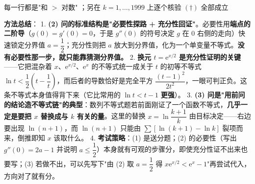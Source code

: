 每一行都是"和 $>$ 对数" ；另在 $k=1,\dots,1999$ 上逐个核验 $(\dagger)$ 全部成立 

\begin{gktip}
\textbf{方法总结}：
1. \textbf{(2) 问的标准结构是"必要性探路 + 充分性回证"}。必要性用\textbf{端点的二阶导}（$g(0)=g'(0)=0$，于是 $g''(0)$ 的符号决定 $g$ 在 $0$ 右侧的走向）快速锁定分界值 $a=\dfrac12$；充分性则把 $a$ 放大到分界值，化为一个单变量不等式。\textbf{没有必要性那一步，就只能靠猜测分界值。}
2. \textbf{换元 $t=\mathrm e^{x/2}$ 是充分性证明的关键}——它把混杂着 $x$、$\mathrm e^{x/2}$、$\mathrm e^{x}$ 的不等式统一成关于 $t$ 的初等不等式 $\ln t<\dfrac12\left(t-\dfrac1t\right)$，而后者的导数恰好是完全平方 $\dfrac{(t-1)^{2}}{2t^{2}}$，一眼可判正负。这条不等式本身值得背下来（它比常用的 $\ln t<t-1$ \textbf{更强}）。
3. \textbf{(3) 问是"用前问的结论造不等式链"的典型}：数列不等式题若前面刚证了一个函数不等式，\textbf{几乎一定是要把 $x$ 替换成与 $k$ 有关的量}。这里的替换 $x=\ln\dfrac{k+1}k$ 由目标决定——右边要出现 $\ln(n+1)$，而 $\ln(n+1)$ 只能由 $\sum\left[\ln(k+1)-\ln k\right]$ 裂项而来，倒推即知 $x$ 该取什么。
4. \textbf{考试策略}：(1) 是送分题；(2) 的必要性（写出 $g''(0)=2a-1$ 并说明 $a\le\dfrac12$）本身就有可观的步骤分，即使充分性证不出来也要写；(3) 若做不出，可以先写下"由 (2) 取 $a=\dfrac12$ 得 $x\mathrm e^{x/2}<\mathrm e^{x}-1$"再尝试代入，方向对了就有分。
\end{gktip}
